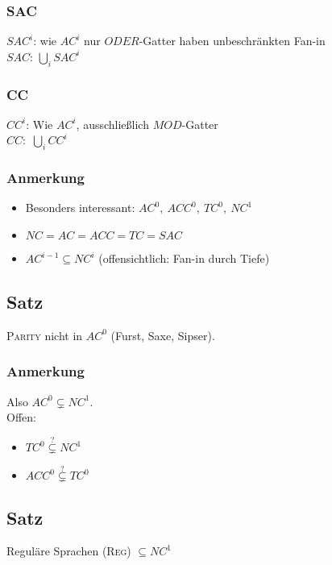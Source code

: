         \subsubsection{SAC}
            $SAC^i$: wie $AC^i$ nur $ODER$-Gatter haben unbeschränkten Fan-in\\
            $SAC$: $\bigcup\limits_i SAC^i$
        \subsubsection{CC}
            $CC^i$: Wie $AC^i$, ausschließlich $MOD$-Gatter\\
            $CC:$ $\bigcup\limits_i CC^i$
        \subsubsection{Anmerkung}
        \begin{itemize}
            \item Besonders interessant: $AC^0,\ ACC^0,\ TC^0,\ NC^1$
            \item $NC=AC=ACC=TC=SAC$
            \item $AC^{i-1}\subseteq NC^i$ (offensichtlich: Fan-in durch Tiefe)
        \end{itemize}
    \subsection{Satz}
        \textsc{Parity} nicht in $AC^0$ (Furst, Saxe, Sipser).
        \subsubsection{Anmerkung}
            Also $AC^0\subsetneq NC^1$.\\
            Offen:
            \begin{itemize}
                \item $TC^0\overset{?}{\subsetneq} NC^1$
                \item $ACC^0\overset{?}{\subsetneq} TC^0$
            \end{itemize}
    \subsection{Satz}
        Reguläre Sprachen (\textsc{Reg}) $\subseteq NC^1$
